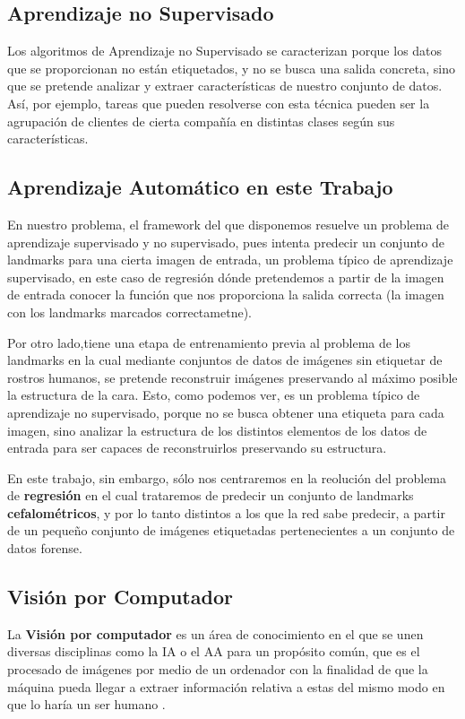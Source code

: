     \subsection{Aprendizaje no Supervisado}
        \noindent Los algoritmos de Aprendizaje no Supervisado se caracterizan porque los datos que se proporcionan no están etiquetados, y no se busca una salida concreta, sino que se pretende analizar y extraer características de nuestro conjunto de datos. Así, por ejemplo, tareas que pueden resolverse con esta técnica pueden ser la agrupación de clientes de cierta compañía en distintas clases según sus características.
    
    \subsection{Aprendizaje Automático en este Trabajo}
        \noindent En nuestro problema, el framework del que disponemos resuelve un problema de aprendizaje supervisado y no supervisado, pues intenta predecir un conjunto de landmarks para una cierta imagen de entrada, un problema típico de aprendizaje supervisado, en este caso de regresión dónde pretendemos a partir de la imagen de entrada conocer la función que nos proporciona la salida correcta (la imagen con los landmarks marcados correctametne).

        \medskip

        \noindent Por otro lado,tiene una etapa de entrenamiento previa al problema de los landmarks en la cual mediante conjuntos de datos de imágenes sin etiquetar de rostros humanos, se pretende reconstruir imágenes preservando al máximo posible la estructura de la cara. Esto, como podemos ver, es un problema típico de aprendizaje no supervisado, porque no se busca obtener una etiqueta para cada imagen, sino analizar la estructura de los distintos elementos de los datos de entrada para ser capaces de reconstruirlos preservando su estructura.

        \medskip

        \noindent En este trabajo, sin embargo, sólo nos centraremos en la reolución del problema de \textbf{regresión} en el cual trataremos de predecir un conjunto de landmarks \textbf{cefalométricos}, y por lo tanto distintos a los que la red sabe predecir, a partir de un  pequeño conjunto de imágenes etiquetadas pertenecientes a un conjunto de datos forense.

    \subsection{Visión por Computador}
        \noindent La \textbf{Visión por computador} es un área de conocimiento en el que se unen diversas disciplinas como la IA o el AA para un propósito común, que es el procesado de imágenes por medio de un ordenador con la finalidad de que la máquina pueda llegar a extraer información relativa a estas del mismo modo en que lo haría un ser humano \cite{rosenfeld1988computer}. 

